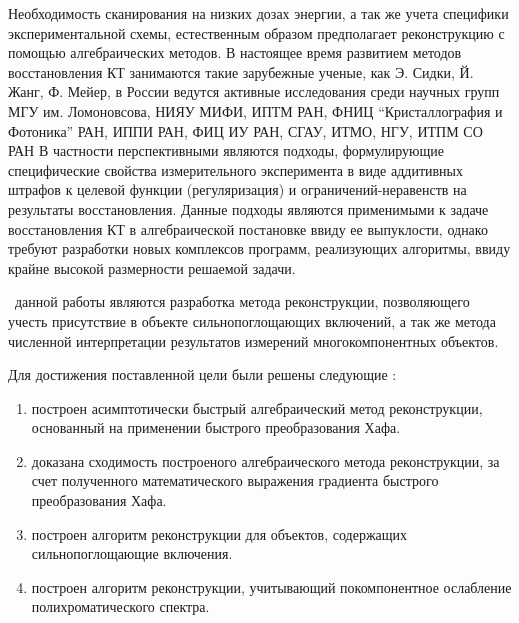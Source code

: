 Необходимость сканирования на низких дозах энергии, а так же учета специфики экспериментальной схемы, естественным образом предполагает реконструкцию с помощью алгебраических методов.
В настоящее время развитием методов восстановления КТ занимаются такие зарубежные ученые, как Э. Сидки, Й. Жанг, Ф. Мейер, в России ведутся активные исследования среди научных групп МГУ им. Ломоновсова, НИЯУ МИФИ, ИПТМ РАН, ФНИЦ ``Кристаллография и Фотоника'' РАН, ИППИ РАН, ФИЦ ИУ РАН, СГАУ, ИТМО, НГУ, ИТПМ СО РАН
В частности перспективными являются подходы, формулирующие специфические свойства измерительного эксперимента в виде аддитивных штрафов к целевой функции (регуляризация) и ограничений-неравенств на результаты восстановления.
Данные подходы являются применимыми к задаче восстановления КТ в алгебраической постановке ввиду ее выпуклости, однако требуют разработки новых комплексов программ, реализующих алгоритмы, ввиду крайне высокой размерности решаемой задачи.








{\aim} ~данной работы являются разработка метода реконструкции, позволяющего учесть присутствие в объекте сильнопоглощающих включений, а так же метода численной интерпретации результатов измерений многокомпонентных объектов.

Для достижения поставленной цели были решены следующие {\tasks}:
\begin{enumerate}
  \item построен асимптотически быстрый алгебраический метод реконструкции, основанный на применении быстрого преобразования Хафа.
  \item доказана сходимость построеного алгебраического метода реконструкции, за счет полученного математического выражения градиента быстрого преобразования Хафа.
  \item построен алгоритм реконструкции для объектов, содержащих сильнопоглощающие включения.
  \item построен алгоритм реконструкции, учитывающий покомпонентное ослабление полихроматического спектра.
\end{enumerate}


